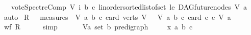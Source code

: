 \begin{isabellebody}
\ \ \ {\isacharparenleft}{\kern0pt}vote{\isacharunderscore}{\kern0pt}SpectreComp\ V\ i\ b\ c{\isacharparenright}{\kern0pt}{\isacharparenright}{\kern0pt}\ {\isacharparenleft}{\kern0pt}linorder{\isachardot}{\kern0pt}sorted{\isacharunderscore}{\kern0pt}list{\isacharunderscore}{\kern0pt}of{\isacharunderscore}{\kern0pt}set\ le\ {\isacharparenleft}{\kern0pt}DAG{\isachardot}{\kern0pt}future{\isacharunderscore}{\kern0pt}nodes\ V\ a{\isacharparenright}{\kern0pt}{\isacharparenright}{\kern0pt}{\isacharparenright}{\kern0pt}{\isacharparenright}{\kern0pt}{\isachardoublequoteclose}\isanewline
%
\isadelimproof
\ \ %
\endisadelimproof
%
\isatagproof
{}\isamarkupfalse%
\ auto%
\endisatagproof
{\isafoldproof}%
%
\isadelimproof
\isanewline
%
\endisadelimproof
{}\isamarkupfalse%
\isanewline
%
\isadelimproof
%
\endisadelimproof
%
\isatagproof
{}\isamarkupfalse%
\isanewline
{}\isamarkupfalse%
\ {\isacharquery}{\kern0pt}R\ {\isacharequal}{\kern0pt}\ {\isachardoublequoteopen}\ measures\ {\isacharbrackleft}{\kern0pt}{\isacharparenleft}{\kern0pt}\ {\isasymlambda}{\isacharparenleft}{\kern0pt}V{\isacharcomma}{\kern0pt}\ a{\isacharcomma}{\kern0pt}\ b{\isacharcomma}{\kern0pt}\ c{\isacharparenright}{\kern0pt}{\isachardot}{\kern0pt}\ {\isacharparenleft}{\kern0pt}card\ {\isacharparenleft}{\kern0pt}verts\ V{\isacharparenright}{\kern0pt}{\isacharparenright}{\kern0pt}{\isacharparenright}{\kern0pt}{\isacharcomma}{\kern0pt}\ \ {\isacharparenleft}{\kern0pt}\ {\isasymlambda}{\isacharparenleft}{\kern0pt}V{\isacharcomma}{\kern0pt}\ a{\isacharcomma}{\kern0pt}\ b{\isacharcomma}{\kern0pt}\ c{\isacharparenright}{\kern0pt}{\isachardot}{\kern0pt}\ card\ {\isacharbraceleft}{\kern0pt}e{\isachardot}{\kern0pt}\ e\ {\isasymrightarrow}\isactrlsup {\isacharasterisk}{\kern0pt}\isactrlbsub V\isactrlesub \ a{\isacharbraceright}{\kern0pt}{\isacharparenright}{\kern0pt}{\isacharbrackright}{\kern0pt}\ {\isachardoublequoteclose}\ \ \isanewline
\ \ \isamarkupfalse%
\ {\isachardoublequoteopen}wf\ {\isacharquery}{\kern0pt}R{\isachardoublequoteclose}\isanewline
\ \ \ \ \isamarkupfalse%
\ simp\ \isanewline
{}\isamarkupfalse%
\ \isanewline
\ \ \isamarkupfalse%
\ V{\isacharcolon}{\kern0pt}{\isacharcolon}{\kern0pt}{\isachardoublequoteopen}{\isacharparenleft}{\kern0pt}{\isacharprime}{\kern0pt}a\ set{\isacharcomma}{\kern0pt}\ {\isacharprime}{\kern0pt}b{\isacharparenright}{\kern0pt}\ pre{\isacharunderscore}{\kern0pt}digraph{\isachardoublequoteclose}\ \isanewline
\ \ \isamarkupfalse%
\ x\ a\ b\ c\isanewline

\end{isabellebody}
